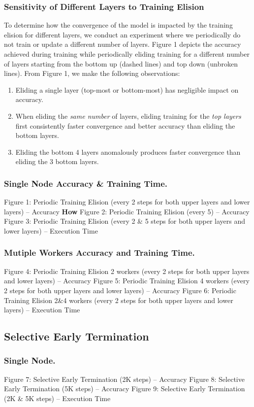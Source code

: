 \subsubsection{Sensitivity of Different Layers to Training Elision}
To determine how the convergence of the model is impacted by the training elision for different layers, we conduct an experiment where we periodically do not train or update a different number of layers. Figure 1 depicts the accuracy achieved during training while periodically eliding training for a different number of layers starting from the bottom up (dashed lines) and top down (unbroken lines).
From Figure 1, we make the following observations: 
\begin{enumerate}
\item Eliding a single layer (top-most or bottom-most) has negligible impact on accuracy.
\item When eliding the \emph{same number} of layers, eliding training for the \emph{top layers} first consistently faster convergence and better accuracy than eliding the bottom layers.
\item Eliding the bottom 4 layers anomalously produces faster convergence than eliding the 3 bottom layers. 
\end{enumerate}
\subsubsection{Single Node Accuracy \& Training Time.}
Figure 1: Periodic Training Elision (every 2 steps for both upper layers and lower layers) -- Accuracy
\textbf{How}
Figure 2: Periodic Training Elision (every 5) -- Accuracy
Figure 3: Periodic Training Elision (every 2 \& 5 steps for both upper layers and lower layers) -- Execution Time
\subsubsection{Mutiple Workers Accuracy and Training Time.}
Figure 4: Periodic Training Elision 2 workers (every 2 steps for both upper layers and lower layers) -- Accuracy
Figure 5: Periodic Training Elision 4 workers (every 2 steps for both upper layers and lower layers) -- Accuracy
Figure 6: Periodic Training Elision 2\&4 workers (every 2 steps for both upper layers and lower layers) -- Execution Time
\subsection{Selective Early Termination}
\subsubsection{Single Node.} 
Figure 7: Selective Early Termination (2K steps) -- Accuracy
Figure 8: Selective Early Termination (5K steps) -- Accuracy
Figure 9: Selective Early Termination (2K \& 5K steps) -- Execution Time
